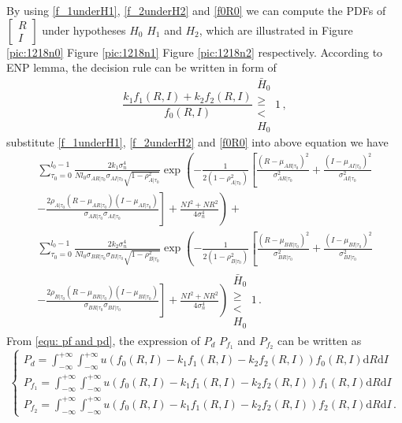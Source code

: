 By using \eqref{f_1underH1}, \eqref{f_2underH2} and \eqref{f0R0} we can compute the PDFs of  $\begin{bmatrix}
  R \\
  I
\end{bmatrix}$ under hypotheses $H_0$ $H_1$ and $H_2$, which are illustrated in Figure \ref{pic:1218n0} Figure \ref{pic:1218n1} Figure \ref{pic:1218n2} respectively. 
According to ENP lemma, the decision rule can be written in form of 
\begin{equation}
  \frac{k_1f_1(R,I)+k_2f_2(R,I)}{f_0(R,I)}\substack{\bar{H}_0 \\ \geq \\ < \\ H_0} 1\,,
\end{equation}
substitute \eqref{f_1underH1}, \eqref{f_2underH2} and \eqref{f0R0} into above equation we have 
\begin{equation}
\begin{split}
\sum_{\tau_0=0}^{l_0-1}\frac{2k_1\sigma_n^4}{Nl_0\sigma_{AR|\tau_0}\sigma_{AI|\tau_0}\sqrt{1-\rho_{A|\tau_0}^2}}\exp\left(-\frac{1}{2(1-\rho_{A|\tau_0}^2)}\left[ \frac{(R-\mu_{AR|\tau_0})^2}{\sigma_{AR|\tau_0}^2}+\frac{(I-\mu_{AI|\tau_0})^2}{\sigma_{AI|\tau_0}^2} \right. \right. \\
\left. \left.  - \frac{2\rho_{A|\tau_0}(R-\mu_{AR|\tau_0})(I-\mu_{AI|\tau_0})}{\sigma_{AR|\tau_0}\sigma_{AI|\tau_0}} \right] +\frac{NI^2+NR^2}{4\sigma_n^4}\right)
+\\
\sum_{\tau_0=0}^{l_0-1}\frac{2k_2\sigma_n^4}{Nl_0\sigma_{BR|\tau_0}\sigma_{BI|\tau_0}\sqrt{1-\rho_{B|\tau_0}^2}}\exp\left(
-\frac{1}{2(1-\rho_{B|\tau_0}^2)}\left[ \frac{(R-\mu_{BR|\tau_0})^2}{\sigma_{BR|\tau_0}^2}+\frac{(I-\mu_{BI|\tau_0})^2}{\sigma_{BI|\tau_0}^2} \right. \right. \\
\left. \left. - \frac{2\rho_{B|\tau_0}(R-\mu_{BR|\tau_0})(I-\mu_{BI|\tau_0})}{\sigma_{BR|\tau_0}\sigma_{BI|\tau_0}}  
\right] +\frac{NI^2+NR^2}{4\sigma_n^4}
\right) \substack{\bar{H}_0 \\ \geq \\ < \\ H_0}1\,.
\end{split}
\end{equation}
From \eqref{equ: pf and pd}, the expression of $P_d$ $P_{f_1}$ and $P_{f_2}$ can be written as
\begin{equation}
  \begin{cases}
    P_d = \int_{-\infty}^{+\infty}\int_{-\infty}^{+\infty} u(f_0(R,I) - k_1f_1(R,I) - k_2f_2(R,I))f_0(R,I)\mathrm{d}R\mathrm{d}I\\ 
	P_{f_1} = \int_{-\infty}^{+\infty}\int_{-\infty}^{+\infty} u(f_0(R,I) - k_1f_1(R,I) - k_2f_2(R,I))f_1(R,I)\mathrm{d}R\mathrm{d}I\\
	P_{f_2} = \int_{-\infty}^{+\infty}\int_{-\infty}^{+\infty} u(f_0(R,I) - k_1f_1(R,I) - k_2f_2(R,I))f_2(R,I)\mathrm{d}R\mathrm{d}I\,. 
  \end{cases}
  \label{asdffghj}
\end{equation}

